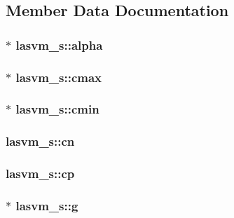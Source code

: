 \subsection{Member Data Documentation}
\hypertarget{structlasvm__s_a6360f37d6c628bf106cfc806ad0fa61a}{
\subsubsection[{alpha}]{$\ast$ lasvm\+\_\+s\+::alpha}}\label{structlasvm__s_a6360f37d6c628bf106cfc806ad0fa61a}
\hypertarget{structlasvm__s_a56d3c6931751fb50d949d5d52f18989b}{
\subsubsection[{cmax}]{$\ast$ lasvm\+\_\+s\+::cmax}}\label{structlasvm__s_a56d3c6931751fb50d949d5d52f18989b}
\hypertarget{structlasvm__s_ac58d4c1cb1ae6aa94e6253bad9bd43a6}{
\subsubsection[{cmin}]{$\ast$ lasvm\+\_\+s\+::cmin}}\label{structlasvm__s_ac58d4c1cb1ae6aa94e6253bad9bd43a6}
\hypertarget{structlasvm__s_a3b00e77d65c9a6c2f983bcffd41f466f}{
\subsubsection[{cn}]{ lasvm\+\_\+s\+::cn}}\label{structlasvm__s_a3b00e77d65c9a6c2f983bcffd41f466f}
\hypertarget{structlasvm__s_aebbca80afbde39cdf064cc534c6ded50}{
\subsubsection[{cp}]{ lasvm\+\_\+s\+::cp}}\label{structlasvm__s_aebbca80afbde39cdf064cc534c6ded50}
\hypertarget{structlasvm__s_a45768418da49b38c41888a364986b650}{
\subsubsection[{g}]{$\ast$ lasvm\+\_\+s\+::g}}\label{structlasvm__s_a45768418da49b38c41888a364986b650}
